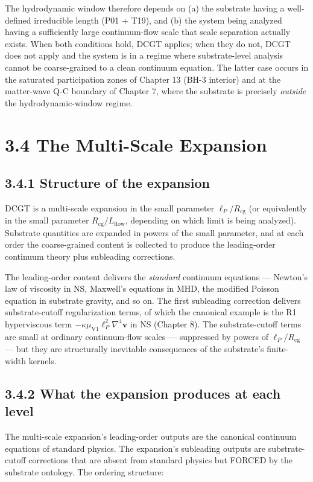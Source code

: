 \documentclass[11pt]{book}
\begin{document}
The hydrodynamic window therefore depends on (a) the substrate having a well-defined irreducible length (P01 + T19), and (b) the system being analyzed having a sufficiently large continuum-flow scale that scale separation actually exists. When both conditions hold, DCGT applies; when they do not, DCGT does not apply and the system is in a regime where substrate-level analysis cannot be coarse-grained to a clean continuum equation. The latter case occurs in the saturated participation zones of Chapter 13 (BH-3 interior) and at the matter-wave Q-C boundary of Chapter 7, where the substrate is precisely \textit{outside} the hydrodynamic-window regime.

\section{3.4 The Multi-Scale Expansion}

\subsection{3.4.1 Structure of the expansion}

DCGT is a multi-scale expansion in the small parameter $\ell_P/R_\mathrm{cg}$ (or equivalently in the small parameter $R_\mathrm{cg}/L_\mathrm{flow}$, depending on which limit is being analyzed). Substrate quantities are expanded in powers of the small parameter, and at each order the coarse-grained content is collected to produce the leading-order continuum theory plus subleading corrections.

The leading-order content delivers the \textit{standard} continuum equations — Newton's law of viscosity in NS, Maxwell's equations in MHD, the modified Poisson equation in substrate gravity, and so on. The first subleading correction delivers substrate-cutoff regularization terms, of which the canonical example is the R1 hyperviscous term $-\kappa\mu_\mathrm{V1}\ell_P^2 \nabla^4\mathbf{v}$ in NS (Chapter 8). The substrate-cutoff terms are small at ordinary continuum-flow scales — suppressed by powers of $\ell_P/R_\mathrm{cg}$ — but they are structurally inevitable consequences of the substrate's finite-width kernels.

\subsection{3.4.2 What the expansion produces at each level}

The multi-scale expansion's leading-order outputs are the canonical continuum equations of standard physics. The expansion's subleading outputs are substrate-cutoff corrections that are absent from standard physics but FORCED by the substrate ontology. The ordering structure:
\end{document}
